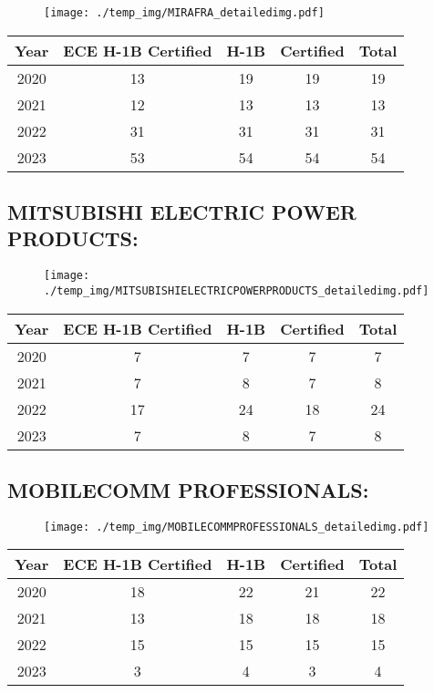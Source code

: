 \documentclass{article}%
\begin{document}
\begin{figure}[htbp]%
\centering%
\texttt{[image: ./temp\_img/MIRAFRA\_detailedimg.pdf]}%
\end{figure}

%
\begin{longtable}{c|c|c|c|c}%
\hline%
Year&ECE H{-}1B Certified&H{-}1B&Certified&Total\\%
\hline%
2020&13&19&19&19\\%
\hline%
2021&12&13&13&13\\%
\hline%
2022&31&31&31&31\\%
\hline%
2023&53&54&54&54\\%
\hline%
\end{longtable}

%
\newpage%
\subsection{MITSUBISHI ELECTRIC POWER PRODUCTS:}%
\label{subsec:MITSUBISHIELECTRICPOWERPRODUCTS}%
\label{MITSUBISHIELECTRICPOWERPRODUCTSdetailed}%


\begin{figure}[htbp]%
\centering%
\texttt{[image: ./temp\_img/MITSUBISHIELECTRICPOWERPRODUCTS\_detailedimg.pdf]}%
\end{figure}

%
\begin{longtable}{c|c|c|c|c}%
\hline%
Year&ECE H{-}1B Certified&H{-}1B&Certified&Total\\%
\hline%
2020&7&7&7&7\\%
\hline%
2021&7&8&7&8\\%
\hline%
2022&17&24&18&24\\%
\hline%
2023&7&8&7&8\\%
\hline%
\end{longtable}

%
\newpage%
\subsection{MOBILECOMM PROFESSIONALS:}%
\label{subsec:MOBILECOMMPROFESSIONALS}%
\label{MOBILECOMMPROFESSIONALSdetailed}%


\begin{figure}[htbp]%
\centering%
\texttt{[image: ./temp\_img/MOBILECOMMPROFESSIONALS\_detailedimg.pdf]}%
\end{figure}

%
\begin{longtable}{c|c|c|c|c}%
\hline%
Year&ECE H{-}1B Certified&H{-}1B&Certified&Total\\%
\hline%
2020&18&22&21&22\\%
\hline%
2021&13&18&18&18\\%
\hline%
2022&15&15&15&15\\%
\hline%
2023&3&4&3&4\\%
\hline%
\end{longtable}
\end{document}
